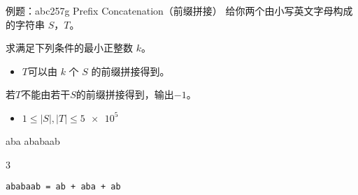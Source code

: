 \documentclass{ctexbeamer}
\begin{document}
\begin{frame}[fragile]{例题：abc257g Prefix Concatenation（前缀拼接）}
给你两个由小写英文字母构成的字符串 $S$，$T$。

求满足下列条件的最小正整数 $k$。
\begin{itemize}
    \item $T$可以由 $k$ 个 $S$ 的前缀拼接得到。
\end{itemize}
若$T$不能由若干$S$的前缀拼接得到，输出$-1$。

\begin{itemize}
    \item $1 \le |S|, |T| \le \num{5e5}$
\end{itemize}

\begin{tcolorbox}[sidebyside,title=样例]
\begin{cverb}
aba
ababaab
\end{cverb}
\tcblower
\begin{cverb}
3
\end{cverb}
\end{tcolorbox}
\verb|ababaab = ab + aba + ab|
\end{frame}
\end{document}

